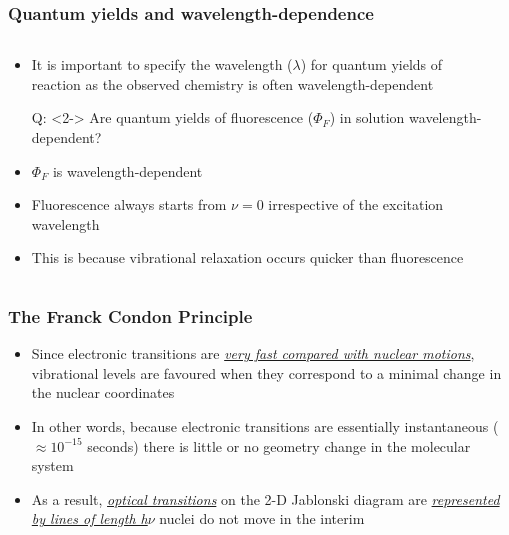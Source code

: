 \documentclass[a4paper,12pt,titlepage]{article}
\begin{document}
\begin{frame}
\frametitle{Quantum yields and wavelength-dependence}
\begin{columns}[T]
\begin{column}{.7\textwidth}
\begin{itemize}
\item<1-> It is important to specify the wavelength (\(\lambda\)) for quantum yields of reaction as the observed chemistry is often wavelength-dependent
\item[Q:]<2-> Are quantum yields of fluorescence (\(\Phi_F\)) in solution wavelength-dependent?
\item<3-> \(\Phi_F\) is wavelength-dependent
\item<4-> Fluorescence always starts from \(\nu = 0\) irrespective of the excitation wavelength
\item<5> This is because vibrational relaxation occurs quicker than fluorescence
\end{itemize}
\end{column}
\begin{column}{.3\textwidth}
\end{column}
\end{columns}
\end{frame}

\begin{frame}[<+->]
\frametitle{The Franck Condon Principle}
\begin{itemize}
\item Since electronic transitions are \textit{\underline{very fast compared with nuclear motions}}, vibrational levels are favoured when they correspond to a minimal change in the nuclear coordinates
\item In other words, because electronic transitions are essentially instantaneous (\(\approx10^{-15}\) seconds) there is little or no geometry change in the molecular system
\item As a result, \textit{\underline{optical transitions}} on the 2-D Jablonski diagram are \newline \textit{\underline{represented by lines of length h\(\nu\)}} \textemdash nuclei do not move in the interim
\end{itemize}
\end{frame}
\end{document}
